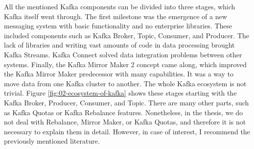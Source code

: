 All the mentioned Kafka components can be divided into three stages, which Kafka itself went through. The first milestone was the emergence of a new messaging system with basic functionality and no enterprise libraries. These included components such as Kafka Broker, Topic, Consumer, and Producer. The lack of libraries and writing vast amounts of code in data processing brought Kafka Streams. Kafka Connect solved data integration problems between other systems. Finally, the Kafka Mirror Maker 2 concept came along, which improved the Kafka Mirror Maker predecessor with many capabilities. It was a way to move data from one Kafka cluster to another. The whole Kafka ecosystem is not trivial. Figure \ref{fig:02-ecosystem-of-kafka} shows these stages starting with the Kafka Broker, Producer, Consumer, and Topic. There are many other parts, such as Kafka Quotas or Kafka Rebalance features. Nonetheless, in the thesis, we do not deal with Rebalance, Mirror Maker, or Kafka Quotas, and therefore it is not necessary to explain them in detail. However, in case of interest, I recommend the previously mentioned literature.
